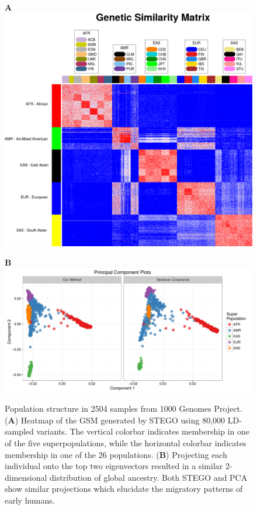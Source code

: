 \begin{figure}
\textbf{A}\includegraphics[width=0.75\columnwidth]{figures/GSM_trim}

\textbf{B}\includegraphics[width=0.8\columnwidth]{figures/PCA_all}\caption{Population structure in 2504 samples from 1000 Genomes Project. (\textbf{A})
Heatmap of the GSM generated by STEGO using 80,000 LD-sampled variants.
The vertical colorbar indicates membership in one of the five superpopulations,
while the horizontal colorbar indicates membership in one of the 26
populations. (\textbf{B}) Projecting each individual onto the top
two eigenvectors resulted in a similar 2-dimensional distribution
of global ancestry. Both STEGO and PCA show similar projections which
elucidate the migratory patterns of early humans.}
\label{fig: heatmaps}
\end{figure}
